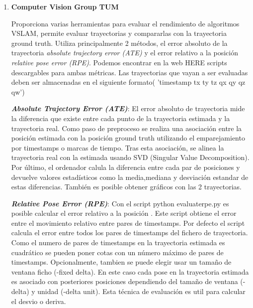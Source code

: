 \begin {enumerate}
\item\textbf{Computer Vision Group TUM}

Proporciona varias herramientas para evaluar el rendimiento de algoritmos VSLAM, permite evaluar trayectorias y compararlas con la trayectoria ground truth.\cite{sturm12iros}
Utiliza principalmente 2 métodos, el error absoluto de la trayectoria \textit{absolute trajectory error (ATE)} y el error relativo a la posición \textit{relative pose error (RPE)}. Podemos encontrar en la web HERE scripts descargables para ambas métricas.
Las trayectorias que vayan a ser evaluadas deben ser almacenadas en el siguiente formato( 'timestamp tx ty tz qx qy qz qw')


 \textbf{\textit{Absolute Trajectory Error (ATE)}}:
 El error absoluto de trayectoria mide la diferencia que existe entre cada punto de la trayectoria estimada y la trayectoria real. Como paso de preproceso se realiza una asociación entre la posición estimada con la posición ground truth utilizando el emparejamiento por timestamps o marcas de tiempo. Tras esta asociación, se alinea la trayectoria real con la estimada usando SVD (Singular Value Decomposition). Por último, el ordenador calula la diferencia entre cada par de posiciones y devuelve valores estadísticos como la media,mediana y desviación estandar de estas diferencias. También es posible obtener gráficos con las 2 trayectorias.

\textbf{\textit{Relative Pose Error (RPE)}}: 
Con el script python evaluaterpe.py es posible calcular el error relativo a la posición . Este script obtiene el error entre el movimiento relativo entre pares de timestamps. Por defecto el script calcula el error entre todos los pares de timestamps del fichero de trayectoria. Como el numero de pares de timestamps en la trayectoria estimada es cuadrático se pueden poner cotas con un número máximo de pares de timestamps. Opcionalmente, tambien se puede elegir usar un tamaño de ventana ficho (-fixed delta). En este caso cada pose en la trayectoria estimada es asociado con posteriores posiciones dependiendo del tamaño de ventana (-delta) y unidad (-delta unit). Esta técnica de evaluación es util para calcular el desvio o deriva.




\end{enumerate}

